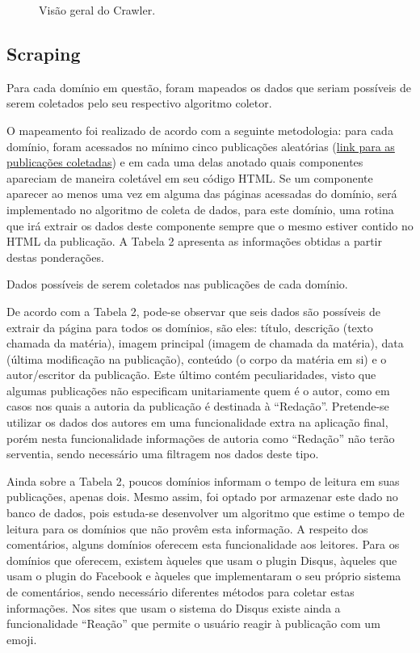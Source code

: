 \begin{figure}[H]
				\centering

\caption{Visão geral do Crawler.}
\end{figure}

\subsection{Scraping}
Para cada domínio em questão, foram mapeados os dados que seriam possíveis de serem coletados pelo seu respectivo algoritmo coletor.
 
O mapeamento foi realizado de acordo com a seguinte metodologia: para cada domínio, foram acessados no mínimo cinco publicações aleatórias (\href{https://docs.google.com/spreadsheets/d/16GBvNhlEYIQu8gTSKxBf8nR-BqBWB0fvnNiLtWflXy8/edit#gid=1793937951}{link para as publicações coletadas}) e em cada uma delas anotado quais componentes apareciam de maneira coletável em seu código HTML. Se um componente aparecer ao menos uma vez em alguma das páginas acessadas do domínio, será implementado no algoritmo de coleta de dados, para este domínio, uma rotina que irá extrair os dados deste componente sempre que o mesmo estiver contido no HTML da publicação. A Tabela 2 apresenta as informações obtidas a partir destas ponderações.  

\begin{table}[H]
				\tiny
\noindent\makebox[\textwidth]{%
}
\caption{Dados possíveis de serem coletados nas publicações de cada domínio.}
\end{table}

De acordo com a Tabela 2, pode-se observar que seis dados são possíveis de extrair da página para todos os domínios, são eles: título, descrição (texto chamada da matéria), imagem principal (imagem de chamada da matéria), data (última modificação na publicação), conteúdo (o corpo da matéria em si) e o autor/escritor da publicação. Este último contém peculiaridades, visto que algumas publicações não especificam unitariamente quem é o autor, como em casos nos quais a autoria da publicação é destinada à “Redação”. Pretende-se utilizar os dados dos autores em uma funcionalidade extra na aplicação final, porém nesta funcionalidade informações de autoria como “Redação” não terão serventia, sendo necessário uma filtragem nos dados deste tipo.

Ainda sobre a Tabela 2, poucos domínios informam o tempo de leitura em suas publicações, apenas dois. Mesmo assim, foi optado por armazenar este dado no banco de dados, pois estuda-se desenvolver um algoritmo que estime o tempo de leitura para os domínios que não provêm esta informação. A respeito dos comentários, alguns domínios oferecem esta funcionalidade aos leitores. Para os domínios que oferecem, existem àqueles que usam o plugin Disqus, àqueles que usam o plugin do Facebook e àqueles que implementaram o seu próprio sistema de comentários, sendo necessário diferentes métodos para coletar estas informações. Nos sites que usam o sistema do Disqus existe ainda a funcionalidade “Reação” que permite o usuário reagir à publicação com um emoji.

